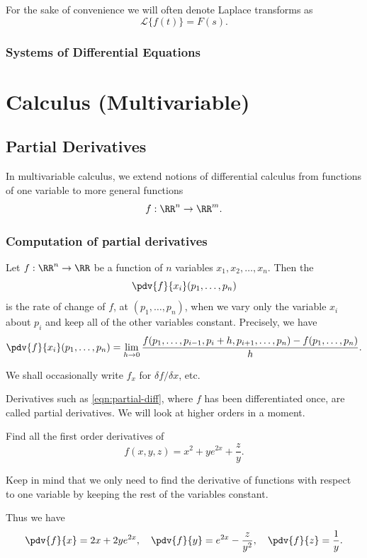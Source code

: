\begin{notation}
For the sake of convenience we will often denote Laplace transforms as
\[ \mathcal{L}\{{f(t)}\}=F(s). \]
\end{notation}

\section{Systems of Differential Equations}
\pagebreak

\part{Calculus (Multivariable)}
\chapter{Partial Derivatives}
In multivariable calculus, we extend notions of differential calculus from functions of one variable to more general functions
\[ f:\RR^n\to\RR^m. \]

\section{Computation of partial derivatives}
Let $f:\RR^n\to\RR$ be a function of $n$ variables $x_1,x_2,\dots,x_n$. Then the 
\[ \pdv{f}{x_i}(p_1,\dots,p_n) \]
is the rate of change of $f$, at $(p_1,\dots,p_n)$, when we vary only the variable $x_i$ about $p_i$ and keep all of the other variables constant. Precisely, we have
\begin{equation}\label{eqn:partial-diff}
\pdv{f}{x_i}(p_1,\dots,p_n)=\lim_{h\to0}\frac{f(p_1,\dots,p_{i-1},p_i+h,p_{i+1},\dots,p_n)-f(p_1,\dots,p_n)}{h}.
\end{equation}

\begin{notation}
We shall occasionally write $f_x$ for $\delta f/\delta x$, etc.
\end{notation}

Derivatives such as \cref{eqn:partial-diff}, where $f$ has been differentiated once, are called  partial derivatives. We will look at higher orders in a moment.

\begin{exercise}
Find all the first order derivatives of
\[ f(x,y,z)=x^2+ye^{2x}+\frac{z}{y}. \]
\end{exercise}

\begin{solution}
Keep in mind that we only need to find the derivative of functions with respect to one variable by keeping the rest of the variables constant.

Thus we have
\[ \pdv{f}{x}=2x+2ye^{2x}, \quad \pdv{f}{y}=e^{2x}-\frac{z}{y^2}, \quad \pdv{f}{z}=\frac{1}{y}. \]
\end{solution}


